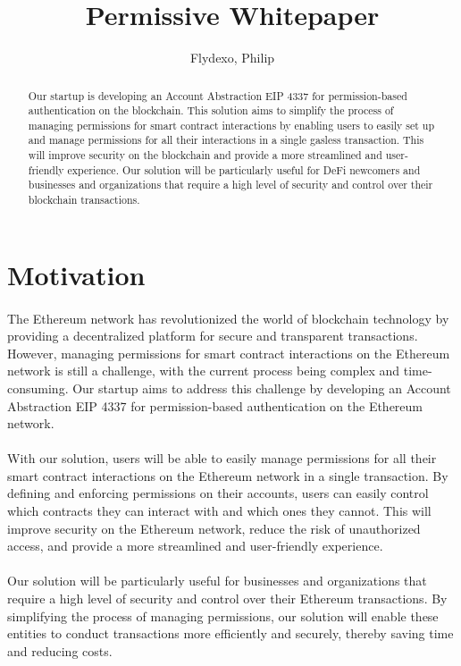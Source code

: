 \documentclass{article}
\title{Permissive Whitepaper}
\author{Flydexo, Philip}
\begin{document}
\maketitle
\begin{abstract}
    Our startup is developing an Account Abstraction EIP 4337 for permission-based authentication on the blockchain. This solution aims to simplify the process of managing permissions for smart contract interactions by enabling users to easily set up and manage permissions for all their interactions in a single gasless transaction. This will improve security on the blockchain and provide a more streamlined and user-friendly experience. Our solution will be particularly useful for DeFi newcomers and businesses and organizations that require a high level of security and control over their blockchain transactions.
\end{abstract}
\tableofcontents
\section{Motivation}
\paragraph{}
The Ethereum network has revolutionized the world of blockchain technology by providing a decentralized platform for secure and transparent transactions. However, managing permissions for smart contract interactions on the Ethereum network is still a challenge, with the current process being complex and time-consuming. Our startup aims to address this challenge by developing an Account Abstraction EIP 4337 for permission-based authentication on the Ethereum network.
\paragraph{}
With our solution, users will be able to easily manage permissions for all their smart contract interactions on the Ethereum network in a single transaction. By defining and enforcing permissions on their accounts, users can easily control which contracts they can interact with and which ones they cannot. This will improve security on the Ethereum network, reduce the risk of unauthorized access, and provide a more streamlined and user-friendly experience.
\paragraph{}
Our solution will be particularly useful for businesses and organizations that require a high level of security and control over their Ethereum transactions. By simplifying the process of managing permissions, our solution will enable these entities to conduct transactions more efficiently and securely, thereby saving time and reducing costs.
\end{document}
